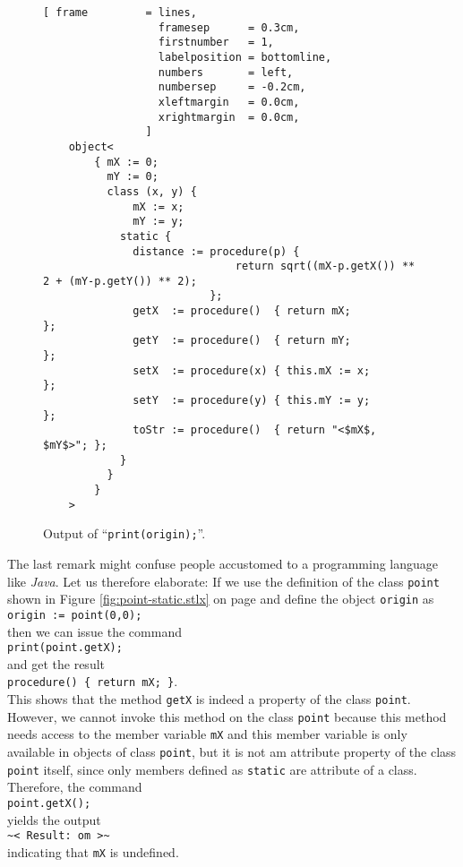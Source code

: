 \begin{figure}[!ht]
\centering
\begin{Verbatim}[ frame         = lines, 
                  framesep      = 0.3cm, 
                  firstnumber   = 1,
                  labelposition = bottomline,
                  numbers       = left,
                  numbersep     = -0.2cm,
                  xleftmargin   = 0.0cm,
                  xrightmargin  = 0.0cm,
                ]
    object<
        { mX := 0; 
          mY := 0; 
          class (x, y) { 
              mX := x; 
              mY := y; 
            static { 
              distance := procedure(p) { 
                              return sqrt((mX-p.getX()) ** 2 + (mY-p.getY()) ** 2); 
                          }; 
              getX  := procedure()  { return mX;             }; 
              getY  := procedure()  { return mY;             }; 
              setX  := procedure(x) { this.mX := x;          }; 
              setY  := procedure(y) { this.mY := y;          }; 
              toStr := procedure()  { return "<$mX$, $mY$>"; }; 
            } 
          } 
        }
    >
\end{Verbatim}
\vspace*{-0.3cm}
\caption{Output of ``\texttt{print(origin);}''.}
\label{fig:point-static.stlx-origin}
\end{figure}

The last remark might confuse people accustomed to a programming language like \textsl{Java}.  Let
us therefore elaborate: If we use the definition of the class \texttt{point} shown in Figure
\ref{fig:point-static.stlx} on page \pageref{fig:point-static.stlx} and define the object
\texttt{origin} as
\\[0.2cm]
\hspace*{1.3cm}
\texttt{origin := point(0,0);}
\\[0.2cm]
then we can issue the command
\\[0.2cm]
\hspace*{1.3cm}
\texttt{print(point.getX);}
\\[0.2cm]
and get the result
\\[0.2cm]
\hspace*{1.3cm}
\texttt{procedure() \{ return mX; \}}.
\\[0.2cm]
This shows that the method \texttt{getX} is indeed a property of the class \texttt{point}.  However, 
we cannot invoke this method on the class \texttt{point} because this method needs access to the
member variable \texttt{mX} and this member variable is only available in objects of class
\texttt{point}, but it is not am attribute property of the class \texttt{point} itself, since only members
defined as \texttt{static} are attribute of a class.  Therefore, the command
\\[0.2cm]
\hspace*{1.3cm}
\texttt{point.getX();}
\\[0.2cm]
yields the output
\\[0.2cm]
\hspace*{1.3cm}
\texttt{\~{}< Result: om >\~}
\\[0.2cm]
indicating that \texttt{mX} is undefined.  

